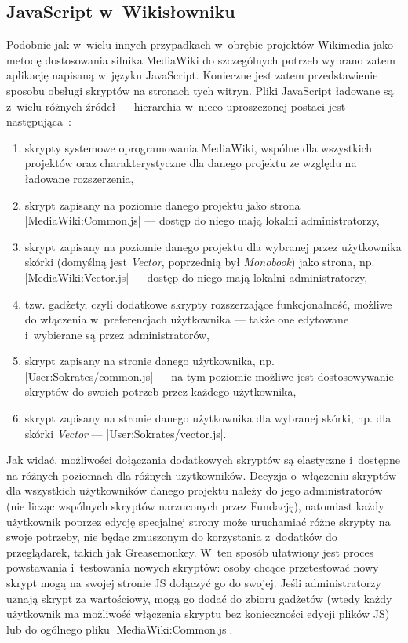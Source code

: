 \subsection{JavaScript w~Wikisłowniku}
Podobnie jak w~wielu innych przypadkach w~obrębie projektów Wikimedia jako metodę dostosowania silnika MediaWiki do szczególnych potrzeb wybrano zatem aplikację napisaną w~języku JavaScript. Konieczne jest zatem przedstawienie sposobu obsługi skryptów na stronach tych witryn. Pliki JavaScript ładowane są z~wielu różnych źródeł --- hierarchia w~nieco uproszczonej postaci jest następująca~\cite{de:js}:
\begin{enumerate}
	\item skrypty systemowe oprogramowania MediaWiki, wspólne dla wszystkich projektów oraz charakterystyczne dla danego projektu ze względu na ładowane rozszerzenia,
	\item skrypt zapisany na poziomie danego projektu jako strona \kod|MediaWiki:Common.js| --- dostęp do niego mają lokalni administratorzy,
	\item skrypt zapisany na poziomie danego projektu dla wybranej przez użytkownika skórki (domyślną jest \emph{Vector}, poprzednią był \emph{Monobook}) jako strona, np. \kod|MediaWiki:Vector.js| --- dostęp do niego mają lokalni administratorzy,
	\item tzw. gadżety, czyli dodatkowe skrypty rozszerzające funkcjonalność, możliwe do włączenia w~preferencjach użytkownika --- także one edytowane i~wybierane są przez administratorów,
	\item skrypt zapisany na stronie danego użytkownika, np. \kod|User:Sokrates/common.js| --- na tym poziomie możliwe jest dostosowywanie skryptów do swoich potrzeb przez każdego użytkownika,
	\item skrypt zapisany na stronie danego użytkownika dla wybranej skórki, np. dla skórki \emph{Vector} --- \kod|User:Sokrates/vector.js|.
\end{enumerate}
Jak widać, możliwości dołączania dodatkowych skryptów są elastyczne i~dostępne na różnych poziomach dla różnych użytkowników. Decyzja o~włączeniu skryptów dla wszystkich użytkowników danego projektu należy do jego administratorów (nie licząc wspólnych skryptów narzuconych przez Fundację), natomiast każdy użytkownik poprzez edycję specjalnej strony może uruchamiać różne skrypty na swoje potrzeby, nie będąc zmuszonym do korzystania z~dodatków do przeglądarek, takich jak Greasemonkey. W~ten sposób ułatwiony jest proces powstawania i~testowania nowych skryptów: osoby chcące przetestować nowy skrypt mogą na swojej stronie JS dołączyć go do swojej. Jeśli administratorzy uznają skrypt za wartościowy, mogą go dodać do zbioru gadżetów (wtedy każdy użytkownik ma możliwość włączenia skryptu bez konieczności edycji plików JS) lub do ogólnego pliku \kod|MediaWiki:Common.js|.

